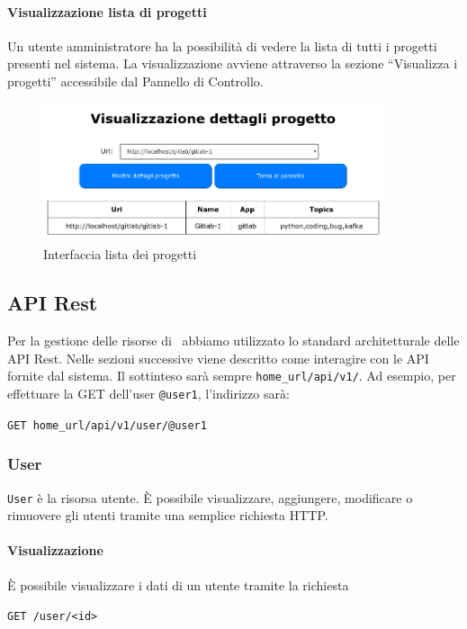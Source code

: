 \paragraph{Visualizzazione lista di progetti}
Un utente amministratore ha la possibilità di vedere la lista di tutti i progetti presenti nel sistema.
La visualizzazione avviene attraverso la sezione ``Visualizza i progetti'' accessibile dal Pannello di Controllo.
\begin{figure}[H]
	\centering
	\includegraphics[width=10cm]{img/project_details.png}
	\caption{Interfaccia lista dei progetti}
\end{figure}

\subsection{API Rest}\label{APIRest}
\newcommand{\homeUrl}{home\_url}

Per la gestione delle risorse di \progetto\ abbiamo utilizzato lo standard architetturale delle API Rest.
Nelle sezioni successive viene descritto come interagire con le API fornite dal sistema.
Il  sottinteso sarà sempre \texttt{\homeUrl/api/v1/}.
Ad esempio, per effettuare la GET dell'user \texttt{@user1}, l'indirizzo sarà:
\begin{center}
    \texttt{GET \homeUrl/api/v1/user/@user1}
\end{center}

\subsubsection{User}

\texttt{User} è la risorsa utente.
È possibile visualizzare, aggiungere, modificare o rimuovere gli utenti tramite una semplice
richiesta HTTP.

\paragraph{Visualizzazione}
È possibile visualizzare i dati di un utente tramite la richiesta
    \begin{center}
        \texttt{GET  /user/<id>}
    \end{center}

